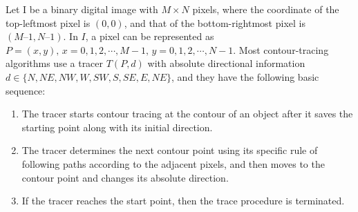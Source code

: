 
Let I be a binary digital image with $M \times N$ pixels, where the coordinate of the top-leftmost pixel is $(0, 0)$, and that of the bottom-rightmost pixel is $(M – 1, N – 1)$. In $I$, a pixel can be represented as $P = (x, y),\, x = 0,1,2,\cdots,M-1,\, y = 0,1,2,\cdots, N-1$. Most contour-tracing algorithms use a tracer $T (P, d)$ with absolute directional information $d\in\{N,NE,NW,W,SW,S,SE,E,NE\}$, and they have the following basic sequence: 


\begin{enumerate}
\item The tracer starts contour tracing at the contour of an object after it saves the starting point along with its initial direction. 
\item The tracer determines the next contour point using its specific rule of following paths according to the adjacent pixels, and then moves to the contour point and changes its absolute direction.
\item If the tracer reaches the start point, then the trace procedure is terminated. 
\end{enumerate}


